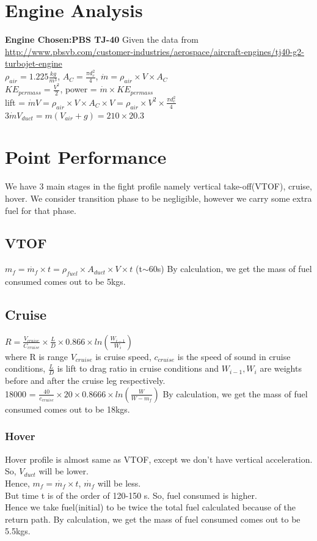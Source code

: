 \section{Engine Analysis}
\textbf{Engine Chosen:PBS TJ-40} Given the data from  \url{http://www.pbsvb.com/customer-industries/aerospace/aircraft-engines/tj40-g2-turbojet-engine} \\
$\rho_{air} = 1.225\frac{kg}{m^3}$, $A_C = \frac{\pi d_c^2}{4}$, $\dot{m} = \rho_{air} \times V \times A_C$ \\
$KE_{per mass} = \frac{V^2}{2}$, power = $\dot{m}\times KE_{per mass}$ \\
lift = $\dot{m}V = \rho_{air}\times V\times A_C\times V = \rho_{air}\times V^2 \times \frac{\pi d_c^2}{4}$ \\
$3\dot{m}V_{duct} = m(V_{air} + g) = 210\times 20.3$
\section{Point Performance}
We have 3 main stages in the fight profile namely vertical take-off(VTOF), cruise, hover. We consider transition phase to be negligible, however we carry some extra fuel for that phase. 
\subsection{VTOF}
$m_f = \dot{m_f}\times t = \rho_{fuel}\times A_{duct}\times V \times t$ (t$\sim$60s)
By calculation, we get the mass of fuel consumed comes out to be 5kgs.
\subsection{Cruise}
$R = \frac{V_{cruise}}{C_{cruise}}\times\frac{L}{D}\times0.866 \times ln(\frac{W_{i-1}}{W_i})$ \\
where R is range $V_{cruise}$ is cruise speed, $c_{cruise}$ is the speed of sound in cruise conditions, $\frac{L}{D}$ is lift to drag ratio in cruise conditions and $W_{i-1}, W_i$ are weights before and after the cruise leg respectively.\\
18000 = $\frac{40}{c_{cruise}}\times20\times0.8666\times ln(\frac{W}{W - m_f})$
By calculation, we get the mass of fuel consumed comes out to be 18kgs.
\subsubsection{Hover}
Hover profile is almost same as VTOF, except we don't have vertical acceleration.\\
So, $V_{duct}$ will be lower.\\
Hence, $m_f = \dot{m_f}\times t$, $\dot{m_f}$ will be less.\\
But time t is of the order of 120-150 s. So, fuel consumed is higher.\\
Hence we take fuel(initial) to be twice the total fuel calculated because of the return path.
By calculation, we get the mass of fuel consumed comes out to be 5.5kgs.
